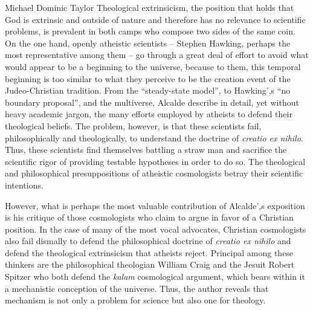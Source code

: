 \begin{recengenv}{Michael Dominic Taylor}
Theological extrinsicism, the position that holds that God is extrinsic and outside of nature and therefore has no relevance to scientific problems, is prevalent in both camps who compose two sides of the same coin. On the one hand, openly atheistic scientists -- Stephen Hawking, perhaps the most representative among them -- go through a great deal of effort to avoid what would appear to be a beginning to the universe, because to them, this temporal beginning is too similar to what they perceive to be the creation event of the Judeo-Christian tradition. From the “steady-state model'', to Hawking',s “no boundary proposal'', and the multiverse, Alcalde describe in detail, yet without heavy academic jargon, the many efforts employed by atheists to defend their theological beliefs. The problem, however, is that these scientists fail, philosophically and theologically, to understand the doctrine of \textit{creatio ex nihilo}. Thus, these scientists find themselves battling a straw man and sacrifice the scientific rigor of providing testable hypotheses in order to do so. The theological and philosophical presuppositions of atheistic cosmologists betray their scientific intentions.

However, what is perhaps the most valuable contribution of Alcalde',s exposition is his critique of those cosmologists who claim to argue in favor of a Christian position. In the case of many of the most vocal advocates, Christian cosmologists also fail dismally to defend the philosophical doctrine of \textit{creatio ex nihilo} and defend the theological extrinsicism that atheists reject. Principal among these thinkers are the philosophical theologian William Craig and the Jesuit Robert Spitzer who both defend the \textit{kalam} cosmological argument, which bears within it a mechanistic conception of the universe. Thus, the author reveals that mechanism is not only a problem for science but also one for theology.


\end{recengenv}
